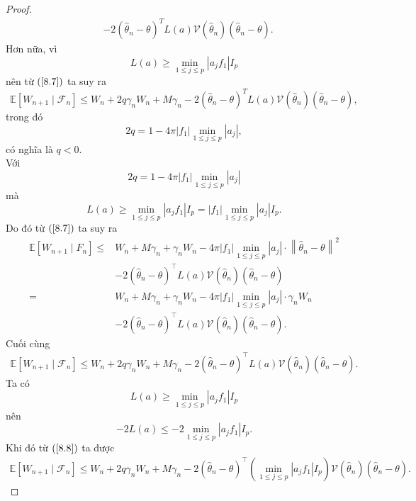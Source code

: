\begin{proof}
\begin{align}
& -2\left(\widehat{\theta}_{n}-\theta\right)^{T} L(a) \mathcal{V}\left(\widehat{\theta}_{n}\right)\left(\widehat{\theta}_{n}-\theta\right). 
\label{8.7}
\end{align}
Hơn nữa, vì
$$
L(a) \geq \min _{1 \leq j \leq p}\left|a_{j} f_{1}\right| I_{p}
$$
nên từ $\left(\text{\ref{8.7}}\right)$ ta suy ra
$$
\mathbb{E}\left[W_{n+1} \mid \mathcal{F}_{n}\right] \leq W_{n}+2 q \gamma_{n} W_{n}+M \gamma_{n}-2\left(\widehat{\theta}_{n}-\theta\right)^{T} L(a)\mathcal{V}\left(\widehat{\theta}_{n}\right)\left(\widehat{\theta}_{n}-\theta\right),
$$
trong đó
$$
2 q=1-4 \pi\left|f_{1}\right| \min _{1 \leq j \leq p}\left|a_{j}\right|,
$$
có nghĩa là $q<0$.\\
Với
$$2q = 1-4 \pi |f_1|\min_{1 \leq j \leq p}|a_j|$$
mà
$$L(a) \geqslant \min_{1 \leqslant j \leqslant p}\left|a_j f_1\right| I_p = \left|f_1\right| \min_{1 \leqslant j \leqslant p}\left|a_j\right| I_p.$$
Do đó từ $\left(\text{\ref{8.7}}\right)$ ta suy ra
$$
\begin{aligned}
    \mathbb{E}\left[W_{n+1} \mid F_n\right] 
    \leqslant &W_n+M \gamma_n+\gamma_n W_n-4 \pi |f_1| \min _{1 \leq j \leq p}\left|a_j\right| \cdot\left\|\hat{\theta}_n-\theta\right\|^2\\
    &-2\left(\hat{\theta}_n-\theta\right)^{\top} L(a) \mathcal{V}\left(\hat{\theta}_n\right)\left(\hat{\theta}_n-\theta\right)\\
    = & W_n+M \gamma_n+\gamma_n W_n-4 \pi |f_1| \min _{1 \leq j \leq p}\left|a_j\right| \cdot \gamma_n W_n\\
    &-2\left(\hat{\theta}_n-\theta\right)^{\top} L(a) \mathcal{V}\left(\hat{\theta}_n\right)\left(\hat{\theta}_n-\theta\right).
\end{aligned}
$$
Cuối cùng
\begin{align}
    \mathbb{E}\left[W_{n+1} \mid \mathcal{F}_{n}\right] \leq W_{n}+2 q \gamma_{n} W_{n}+M \gamma_{n}-2\left(\widehat{\theta}_{n}-\theta\right)^{\top} L(a)\mathcal{V}\left(\widehat{\theta}_{n}\right)\left(\widehat{\theta}_{n}-\theta\right).
    \label{8.8}
\end{align}
Ta có
$$L(a) \geqslant \min_{1 \leqslant j \leqslant p}\left|a_j f_1\right| I_p$$
nên
$$
-2L(a) \leqslant -2\min_{1 \leqslant j \leqslant p}\left|a_j f_1\right| I_p.
$$
Khi đó từ $\left(\ref{8.8}\right)$ ta được
\begin{align}
\mathbb{E}\left[W_{n+1} \mid \mathcal{F}_{n}\right] \leq W_{n}+2 q \gamma_{n} W_{n}+M \gamma_{n}-2\left(\widehat{\theta}_{n}-\theta\right)^{\top} \left(\min_{1 \leqslant j \leqslant p}\left|a_j f_1\right| I_p\right)\mathcal{V}\left(\widehat{\theta}_{n}\right)\left(\widehat{\theta}_{n}-\theta\right).

\end{align}
\end{proof}
